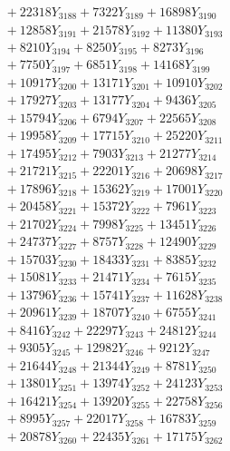 \documentclass[a4paper,10pt]{article}
\begin{document}
{\begin{align}
&\;  + 22318 Y_{3188} + 7322 Y_{3189} + 16898 Y_{3190} \\[0.3ex]
&\;  + 12858 Y_{3191} + 21578 Y_{3192} + 11380 Y_{3193} \\[0.3ex]
&\;  + 8210 Y_{3194} + 8250 Y_{3195} + 8273 Y_{3196} \\[0.3ex]
&\;  + 7750 Y_{3197} + 6851 Y_{3198} + 14168 Y_{3199} \\[0.3ex]
&\;  + 10917 Y_{3200} + 13171 Y_{3201} + 10910 Y_{3202} \\[0.3ex]
&\;  + 17927 Y_{3203} + 13177 Y_{3204} + 9436 Y_{3205} \\[0.3ex]
&\;  + 15794 Y_{3206} + 6794 Y_{3207} + 22565 Y_{3208} \\[0.5ex]\allowbreak
&\;  + 19958 Y_{3209} + 17715 Y_{3210} + 25220 Y_{3211} \\[0.3ex]
&\;  + 17495 Y_{3212} + 7903 Y_{3213} + 21277 Y_{3214} \\[0.3ex]
&\;  + 21721 Y_{3215} + 22201 Y_{3216} + 20698 Y_{3217} \\[0.3ex]
&\;  + 17896 Y_{3218} + 15362 Y_{3219} + 17001 Y_{3220} \\[0.3ex]
&\;  + 20458 Y_{3221} + 15372 Y_{3222} + 7961 Y_{3223} \\[0.3ex]
&\;  + 21702 Y_{3224} + 7998 Y_{3225} + 13451 Y_{3226} \\[0.3ex]
&\;  + 24737 Y_{3227} + 8757 Y_{3228} + 12490 Y_{3229} \\[0.3ex]
&\;  + 15703 Y_{3230} + 18433 Y_{3231} + 8385 Y_{3232} \\[0.3ex]
&\;  + 15081 Y_{3233} + 21471 Y_{3234} + 7615 Y_{3235} \\[0.3ex]
&\;  + 13796 Y_{3236} + 15741 Y_{3237} + 11628 Y_{3238} \\[0.5ex]\allowbreak
&\;  + 20961 Y_{3239} + 18707 Y_{3240} + 6755 Y_{3241} \\[0.3ex]
&\;  + 8416 Y_{3242} + 22297 Y_{3243} + 24812 Y_{3244} \\[0.3ex]
&\;  + 9305 Y_{3245} + 12982 Y_{3246} + 9212 Y_{3247} \\[0.3ex]
&\;  + 21644 Y_{3248} + 21344 Y_{3249} + 8781 Y_{3250} \\[0.3ex]
&\;  + 13801 Y_{3251} + 13974 Y_{3252} + 24123 Y_{3253} \\[0.3ex]
&\;  + 16421 Y_{3254} + 13920 Y_{3255} + 22758 Y_{3256} \\[0.3ex]
&\;  + 8995 Y_{3257} + 22017 Y_{3258} + 16783 Y_{3259} \\[0.3ex]
&\;  + 20878 Y_{3260} + 22435 Y_{3261} + 17175 Y_{3262} \\[0.3ex]

\end{align}}
\end{document}
